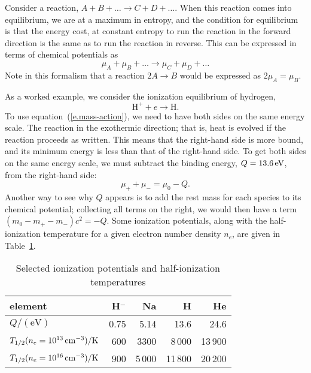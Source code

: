 Consider a reaction, $A + B + \ldots \to C + D + \ldots$. When this reaction comes into equilibrium, we are at a maximum in entropy, and the condition for equilibrium is that the energy cost, at constant entropy to run the reaction in the forward direction is the same as to run the reaction in reverse. This can be expressed in terms of chemical potentials as
\begin{equation}\label{e.mass-action}
\mu_{A} + \mu_{B} + \ldots \to \mu_{C} + \mu_{D} + \ldots
\end{equation}
Note in this formalism that a reaction $2A \to B$ would be expressed as $2\mu_{A} = \mu_{B}$.

As a worked example, we consider the ionization equilibrium of hydrogen,
\[ \mathrm{H^{+}} + e \to \mathrm{H}. \]
To use equation~(\ref{e.mass-action}), we need to have both sides on the same energy scale. The reaction in the exothermic direction; that is, heat is evolved if the reaction proceeds as written.  This means that the right-hand side is more bound, and its minimum energy is less than that of the right-hand side. To get both sides on the same energy scale, we must subtract the binding energy, $Q=13.6\,\mathrm{eV}$, from the right-hand side:
\begin{equation}\label{e.ionization-chem-potential}
\mu_{+} + \mu_{-}= \mu_{0} -  Q.
\end{equation}
Another way to see why $Q$ appears is to add the rest mass for each species to its chemical potential; collecting all terms on the right, we would then have a term $(m_{0}-m_{+}-m_{-})c^{2} = -Q$. Some ionization potentials, along with the half-ionization temperature for a given electron number density $n_{e}$, are given in Table~\ref{t.ionization-potentials}.

\begin{table}[htpb]
\begin{center}
\caption{Selected ionization potentials and half-ionization temperatures}\label{t.ionization-potentials}
\begin{tabular}{l|rrrr}
\hline
element & H$^{-}$ & Na & H & He\\
\hline\hline
$Q/(\mathrm{eV})$ & 0.75 & 5.14 & 13.6 & 24.6\\
$T_{1/2}(n_{e} = 10^{13}\,\mathrm{c}\mathrm{m}^{-3})/\mathrm{K}$ & 600 & 3300 & 8\,000 & 13\,900\\
$T_{1/2}(n_{e} = 10^{16}\,\mathrm{c}\mathrm{m}^{-3})/\mathrm{K}$ & 900 & 5\,000 & 11\,800 & 20\,200\\
\hline
\end{tabular}
\end{center}
\end{table}

